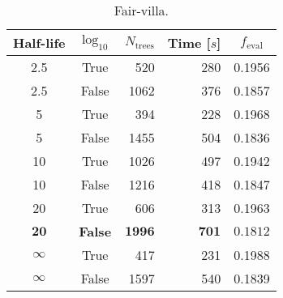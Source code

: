
\begin{table}[]
  \begin{tabular}{@{}ccrrc@{}}
    Half-life & $\log_{10}$ & $N_\mathrm{trees}$ & Time [$s$] & $f_\mathrm{eval}$ \\
    \midrule
    \num{2.5} & True & \num{520} & \num{280} & \num{0.1956} \\
    \num{2.5} & False & \num{1062} & \num{376} & \num{0.1857} \\
    \num{5} & True & \num{394} & \num{228} & \num{0.1968} \\
    \num{5} & False & \num{1455} & \num{504} & \num{0.1836} \\
    \num{10} & True & \num{1026} & \num{497} & \num{0.1942} \\
    \num{10} & False & \num{1216} & \num{418} & \num{0.1847} \\
    \num{20} & True & \num{606} & \num{313} & \num{0.1963} \\
    $\mathbf{20}$ & \textbf{False} & $\mathbf{1996}$ & $\mathbf{701}$ & $\mathbf{0.1812}$ \\
    $\infty$ & True & \num{417} & \num{231} & \num{0.1988} \\
    $\infty$ & False & \num{1597} & \num{540} & \num{0.1839} \\
  \end{tabular}
  \caption{\label{tab:h:HPO_initial_Fair-villa}Fair-villa.}
\end{table}